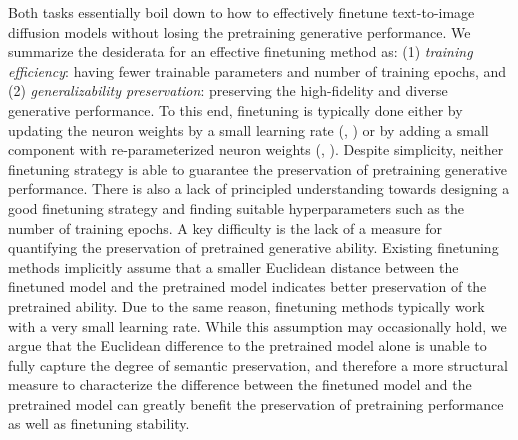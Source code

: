 Both tasks essentially boil down to how to effectively finetune text-to-image diffusion models without losing the pretraining generative performance. We summarize the desiderata for an effective finetuning method as: (1) \emph{training efficiency}: having fewer trainable parameters and number of training epochs, and (2) \emph{generalizability preservation}: preserving the high-fidelity and diverse generative performance. To this end, finetuning is typically done either by updating the neuron weights by a small learning rate (\eg, \cite{ruiz2023dreambooth}) or by adding a small component with re-parameterized neuron weights (\eg, \cite{hulora2022,zhang2023adding}). Despite simplicity, neither finetuning strategy is able to guarantee the preservation of pretraining generative performance. There is also a lack of principled understanding towards designing a good finetuning strategy and finding suitable hyperparameters such as the number of training epochs. A key difficulty is the lack of a measure for quantifying the preservation of pretrained generative ability. Existing finetuning methods implicitly assume that a smaller Euclidean distance between the finetuned model and the pretrained model indicates better preservation of the pretrained ability. Due to the same reason, finetuning methods typically work with a very small learning rate. While this assumption may occasionally hold, we argue that the Euclidean difference to the pretrained model alone is unable to fully capture the degree of semantic preservation, and therefore a more structural measure to characterize the difference between the finetuned model and the pretrained model can greatly benefit the preservation of pretraining performance as well as finetuning stability. 

